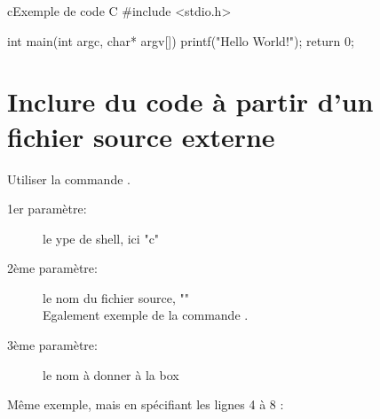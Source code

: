 \begin{sourcebox}{c}{Exemple de code C}
#include <stdio.h>

int main(int argc, char* argv[])
{
   printf("Hello World!\n");
   return 0;
}
\end{sourcebox}



\section{Inclure du code à partir d'un fichier source externe}

Utiliser la commande .
\begin{description}
 \item[1er paramètre:] le ype de shell, ici "c"
 \item[2ème paramètre:] le nom du fichier source, ""\\ Egalement exemple de la commande .
 \item[3ème paramètre:] le nom à donner à la box
\end{description}



Même exemple, mais en spécifiant les lignes 4 à 8 :



